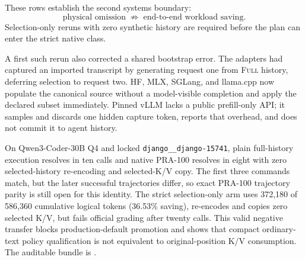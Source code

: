 \documentclass[11pt]{article}
\begin{document}
These rows establish the second systems boundary:
\[
\boxed{\text{physical omission}\;\not\Rightarrow\;
\text{end-to-end workload saving}.}
\]
Selection-only reruns with zero synthetic history are required before the plan
can enter the strict native class.

A first such rerun also corrected a shared bootstrap error.  The adapters had
captured an imported transcript by generating request one from \textsc{Full}
history, deferring selection to request two.  HF, MLX, SGLang, and llama.cpp
now populate the canonical source without a model-visible completion and apply
the declared subset immediately.  Pinned vLLM lacks a public prefill-only API;
it samples and discards one hidden capture token, reports that overhead, and
does not commit it to agent history.

On Qwen3-Coder-30B Q4 and locked
\texttt{django\_\_django-15741}, plain full-history execution resolves in ten
calls and native PRA-100 resolves in eight with zero selected-history
re-encoding and selected-K/V copy.  The first three commands match, but the
later successful trajectories differ, so exact PRA-100 trajectory parity is
still open for this identity.  The strict selection-only arm uses 372,180 of
586,360 cumulative logical tokens (36.53\% saving), re-encodes and copies zero
selected K/V, but fails official grading after twenty calls.  This valid
negative transfer blocks production-default promotion and shows that compact
ordinary-text policy qualification is not equivalent to original-position K/V
consumption.  The auditable bundle is
.
\end{document}
